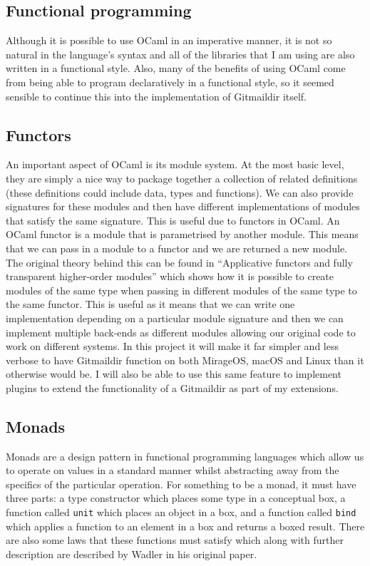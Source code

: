 \subsection{Functional programming}

Although it is possible to use OCaml in an imperative manner, it is not so natural in the language's syntax and all of the libraries that I am using are also written in a functional style. Also, many of the benefits of using OCaml come from being able to program declaratively in a functional style, so it seemed sensible to continue this into the implementation of Gitmaildir itself.

\subsection{Functors}

An important aspect of OCaml is its module system. At the most basic level, they are simply a nice way to package together a collection of related definitions (these definitions could include data, types and functions). We can also provide signatures for these modules and then have different implementations of modules that satisfy the same signature. This is useful due to functors in OCaml. An OCaml functor is a module that is parametrised by another module. This means that we can pass in a module to a functor and we are returned a new module. The original theory behind this can be found in ``Applicative functors and fully transparent higher-order modules''\cite{leroy1995functors} which shows how it is possible to create modules of the same type when passing in different modules of the same type to the same functor. This is useful as it means that we can write one implementation depending on a particular module signature and then we can implement multiple back-ends as different modules allowing our original code to work on different systems. In this project it will make it far simpler and less verbose to have Gitmaildir function on both MirageOS, macOS and Linux than it otherwise would be. I will also be able to use this same feature to implement plugins to extend the functionality of a Gitmaildir as part of my extensions.

\subsection{Monads}

Monads are a design pattern in functional programming languages which allow us to operate on values in a standard manner whilst abstracting away from the specifics of the particular operation. For something to be a monad, it must have three parts: a type constructor which places some type in a conceptual box, a function called \texttt{unit} which places an object in a box, and a function called \texttt{bind} which applies a function to an element in a box and returns a boxed result. There are also some laws that these functions must satisfy which along with further description are described by Wadler in his original paper\cite{wadler90monads}.

